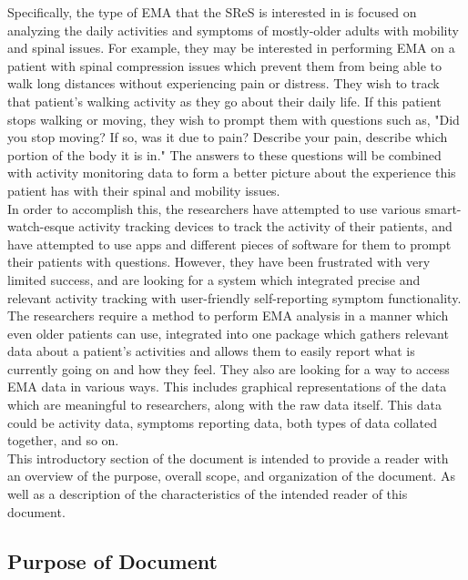 \documentclass[12pt]{article}
\begin{document}
Specifically, the type of EMA that the SReS is interested in is focused on analyzing the daily activities and symptoms of mostly-older adults with mobility and spinal issues. For example, they may be interested in performing EMA on a patient with spinal compression issues which prevent them from being able to walk long distances without experiencing pain or distress. They wish to track that patient's walking activity as they go about their daily life. If this patient stops walking or moving, they wish to prompt them with questions such as, "Did you stop moving? If so, was it due to pain? Describe your pain, describe which portion of the body it is in." The answers to these questions will be combined with activity monitoring data to form a better picture about the experience this patient has with their spinal and mobility issues.\\

In order to accomplish this, the researchers have attempted to use various smart-watch-esque activity tracking devices to track the activity of their patients, and have attempted to use apps and different pieces of software for them to prompt their patients with questions. However, they have been frustrated with very limited success, and are looking for a system which integrated precise and relevant activity tracking with user-friendly self-reporting symptom functionality.\\

The researchers require a method to perform EMA analysis in a manner which even older patients can use, integrated into one package which gathers relevant data about a patient's activities and allows them to easily report what is currently going on and how they feel. They also are looking for a way to access EMA data in various ways. This includes graphical representations of the data which are meaningful to researchers, along with the raw data itself. This data could be activity data, symptoms reporting data, both types of data collated together, and so on. \\

This introductory section of the document is intended to provide a reader with an overview of the purpose, overall scope, and organization of the document. As well as a description of the characteristics of the intended reader of this document.\\

\subsection{Purpose of Document}
\end{document}
